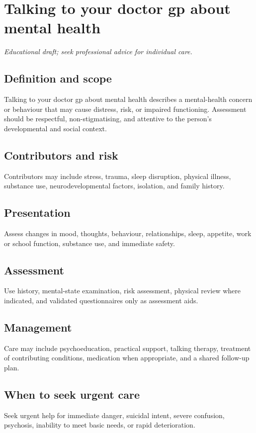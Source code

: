 \chapter{Talking to your doctor gp about mental health}
\medskip
\noindent\textit{Educational draft; seek professional advice for individual care.}

\section*{Definition and scope}
Talking to your doctor gp about mental health describes a mental-health concern or behaviour that may cause distress, risk, or impaired functioning. Assessment should be respectful, non-stigmatising, and attentive to the person’s developmental and social context.

\section*{Contributors and risk}
Contributors may include stress, trauma, sleep disruption, physical illness, substance use, neurodevelopmental factors, isolation, and family history.

\section*{Presentation}
Assess changes in mood, thoughts, behaviour, relationships, sleep, appetite, work or school function, substance use, and immediate safety.

\section*{Assessment}
Use history, mental-state examination, risk assessment, physical review where indicated, and validated questionnaires only as assessment aids.

\section*{Management}
Care may include psychoeducation, practical support, talking therapy, treatment of contributing conditions, medication when appropriate, and a shared follow-up plan.

\section*{When to seek urgent care}
Seek urgent help for immediate danger, suicidal intent, severe confusion, psychosis, inability to meet basic needs, or rapid deterioration.

